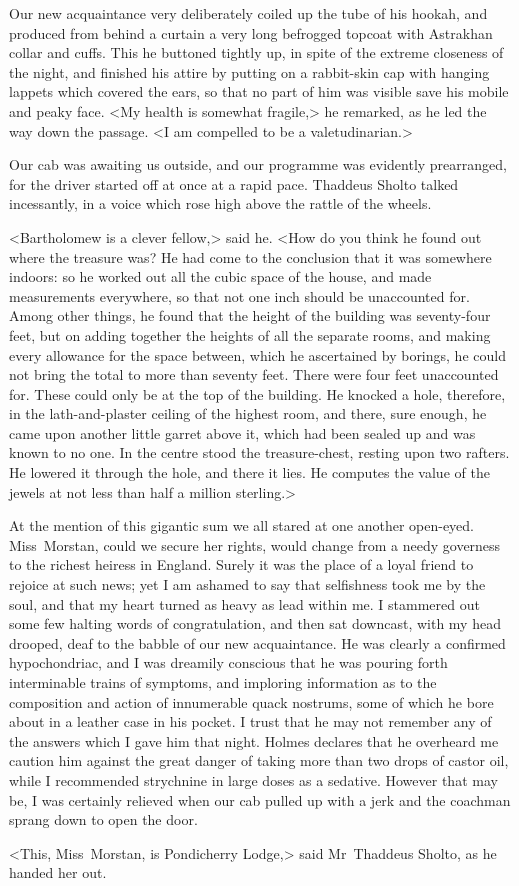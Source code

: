 Our new acquaintance very deliberately coiled up the tube of his hookah, and produced from behind a curtain a very long befrogged topcoat with Astrakhan collar and cuffs. This he buttoned tightly up, in spite of the extreme closeness of the night, and finished his attire by putting on a rabbit-skin cap with hanging lappets which covered the ears, so that no part of him was visible save his mobile and peaky face. <My health is somewhat fragile,> he remarked, as he led the way down the passage. <I am compelled to be a valetudinarian.>

Our cab was awaiting us outside, and our programme was evidently prearranged, for the driver started off at once at a rapid pace. Thaddeus Sholto talked incessantly, in a voice which rose high above the rattle of the wheels.

<Bartholomew is a clever fellow,> said he. <How do you think he found out where the treasure was? He had come to the conclusion that it was somewhere indoors: so he worked out all the cubic space of the house, and made measurements everywhere, so that not one inch should be unaccounted for. Among other things, he found that the height of the building was seventy-four feet, but on adding together the heights of all the separate rooms, and making every allowance for the space between, which he ascertained by borings, he could not bring the total to more than seventy feet. There were four feet unaccounted for. These could only be at the top of the building. He knocked a hole, therefore, in the lath-and-plaster ceiling of the highest room, and there, sure enough, he came upon another little garret above it, which had been sealed up and was known to no one. In the centre stood the treasure-chest, resting upon two rafters. He lowered it through the hole, and there it lies. He computes the value of the jewels at not less than half a million sterling.>

At the mention of this gigantic sum we all stared at one another open-eyed. Miss~Morstan, could we secure her rights, would change from a needy governess to the richest heiress in England. Surely it was the place of a loyal friend to rejoice at such news; yet I am ashamed to say that selfishness took me by the soul, and that my heart turned as heavy as lead within me. I stammered out some few halting words of congratulation, and then sat downcast, with my head drooped, deaf to the babble of our new acquaintance. He was clearly a confirmed hypochondriac, and I was dreamily conscious that he was pouring forth interminable trains of symptoms, and imploring information as to the composition and action of innumerable quack nostrums, some of which he bore about in a leather case in his pocket. I trust that he may not remember any of the answers which I gave him that night. Holmes declares that he overheard me caution him against the great danger of taking more than two drops of castor oil, while I recommended strychnine in large doses as a sedative. However that may be, I was certainly relieved when our cab pulled up with a jerk and the coachman sprang down to open the door.

<This, Miss~Morstan, is Pondicherry Lodge,> said Mr~Thaddeus Sholto, as he handed her out.